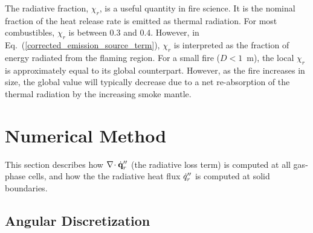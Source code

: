 The radiative
fraction, $\chi_r$, is a useful quantity in fire science. It is the nominal fraction of the heat release rate is emitted as thermal radiation. For most combustibles, $\chi_r$
is between 0.3 and 0.4. However, in Eq.~(\ref{corrected_emission_source_term}), $\chi_r$ is
interpreted as the fraction of energy radiated from the flaming
region.  For a small fire ($D<1$~m), the local $\chi_r$ is
approximately equal to its global counterpart. However, as the fire
increases in size, the global value will typically decrease due to a
net re-absorption of the thermal radiation by the increasing smoke
mantle.


\section{Numerical Method}
\label{radnumericalmethodsection}

This section describes how $\nabla\!\cdot \dot{\bf q}_r''$ (the radiative loss
term) is computed at all gas-phase cells, and how the
the radiative heat flux $\dot{q}_r''$ is computed at solid boundaries.

\subsection{Angular Discretization}
\label{radiation-discre}


